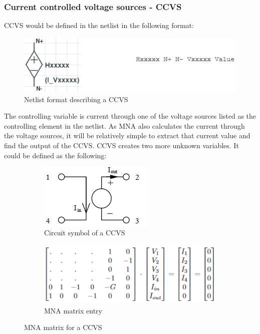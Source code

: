\documentclass[12pt,a4paper]{article}
\begin{document}
\subsubsection{Current controlled voltage sources - CCVS}
CCVS would be defined in the netlist in the following format: \par
\begin{figure} [h!]
	\centering
	\includegraphics[]{H.png}
	\caption{Netlist format describing a CCVS \cite{MNA}}
\end{figure}

The controlling variable is current through one of the voltage sources listed as the controlling element in the netlist.
As MNA also calculates the current through the voltage sources, it will be relatively simple to extract that current
value and find the output of the CCVS. CCVS creates two more unknown variables.
It could be defined as the following:
\begin{figure} [h!]
	\centering
	\begin{subfigure}{.5\textwidth}
	  \centering
	  \includegraphics[scale=0.8]{H_diagram.PNG}
	  \caption{Circuit symbol of a CCVS}
	  \label{fig:sub1}
	\end{subfigure}%
	\begin{subfigure}{.5\textwidth}
	  \centering
	  \includegraphics[width= \textwidth]{H_matrices.PNG}
	  \caption{MNA matrix entry}
	  \label{fig:sub2}
	\end{subfigure}
	\caption{MNA matrix for a CCVS \cite{jahn_margraf_habchi_jacob_2003}}
	\label{fig:test}
\end{figure}
\pagebreak
\end{document}
